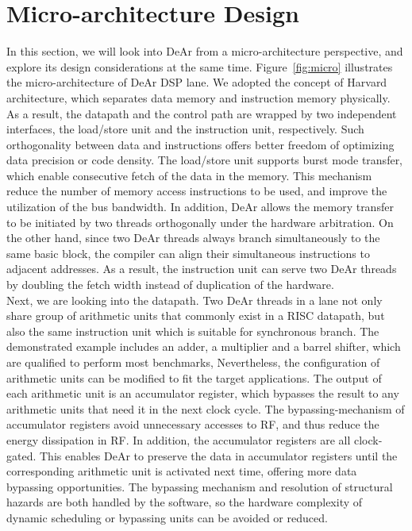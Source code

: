 \section{Micro-architecture Design}
In this section, we will look into DeAr from a micro-architecture perspective, and explore its design considerations at the same time.
Figure~\ref{fig:micro} illustrates the micro-architecture of DeAr DSP lane.
We adopted the concept of Harvard architecture, 
which separates data memory and instruction memory physically\cite{harvard}.
As a result, the datapath and the control path are wrapped by two independent interfaces, the load/store unit and the instruction unit, respectively.
Such orthogonality between data and instructions offers better freedom of optimizing data precision or code density.
The load/store unit supports burst mode transfer, which enable consecutive fetch of the data in the memory.
This mechanism reduce the number of memory access instructions to be used, 
and improve the utilization of the bus bandwidth.
In addition, DeAr allows the memory transfer to be initiated by two threads orthogonally under the hardware arbitration.
On the other hand, since two DeAr threads always branch simultaneously to the same basic block, 
the compiler can align their simultaneous instructions to adjacent addresses.
As a result, the instruction unit can serve two DeAr threads by doubling the fetch width instead of duplication of the hardware.
\\\indent
Next, we are looking into the datapath.
Two DeAr threads in a lane not only share group of arithmetic units that commonly exist in a RISC datapath, 
but also the same instruction unit which is suitable for synchronous branch.
The demonstrated example includes an adder, a multiplier and a barrel shifter, which are qualified to perform most benchmarks,
Nevertheless, the configuration of arithmetic units can be modified to fit the target applications.
The output of each arithmetic unit is an accumulator register, 
which bypasses the result to any arithmetic units that need it in the next clock cycle.
The bypassing-mechanism of accumulator registers avoid unnecessary accesses to RF, 
and thus reduce the energy dissipation in RF.
In addition, the accumulator registers are all clock-gated.
This enables DeAr to preserve the data in accumulator registers until the corresponding arithmetic unit is activated next time, 
offering more data bypassing opportunities.
The bypassing mechanism and resolution of structural hazards are both handled by the software, 
so the hardware complexity of dynamic scheduling or bypassing units can be avoided or reduced.
